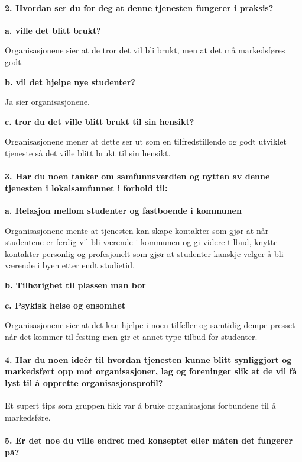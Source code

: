 \paragraph{2. Hvordan ser du for deg at denne tjenesten fungerer i praksis?}
{\bf a. ville det blitt brukt?}

Organisasjonene sier at de tror det vil bli brukt, men at det må markedsføres godt.

{\bf b. vil det hjelpe nye studenter?}

Ja sier organisasjonene.

{\bf c. tror du det ville blitt brukt til sin hensikt?}

Organisasjonene mener at dette ser ut som en tilfredstillende og godt utviklet tjeneste så det ville blitt brukt til sin hensikt.

\paragraph{3. Har du noen tanker om samfunnsverdien og nytten av denne tjenesten i lokalsamfunnet i forhold til:}
{\bf a. Relasjon mellom studenter og fastboende i kommunen}

Organisasjonene mente at tjenesten kan skape kontakter som gjør at når studentene er ferdig vil bli værende i kommunen og gi videre tilbud, knytte kontakter personlig og profesjonelt som gjør at studenter kanskje velger å bli værende i byen etter endt studietid.

{\bf b. Tilhørighet til plassen man bor}



{\bf c. Psykisk helse og ensomhet}

Organisasjonene sier at det kan hjelpe i noen tilfeller og samtidig dempe presset når det kommer til festing men gir et annet type tilbud for studenter.

\paragraph{4. Har du noen ideér til hvordan tjenesten kunne blitt synliggjort og markedsført opp mot organisasjoner, lag og foreninger slik at de vil få lyst til å opprette organisasjonsprofil?}
Et supert tips som gruppen fikk var å bruke organisasjons forbundene til å markedsføre.

\paragraph{5. Er det noe du ville endret med konseptet eller måten det fungerer på?}


